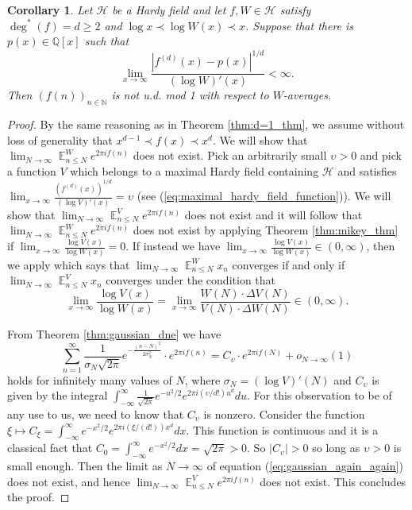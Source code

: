 \documentclass[12pt]{article}
\theoremstyle{plain} %
\newtheorem{corollary}[theorem]{Corollary}
\theoremstyle{definition} %
\theoremstyle{plain}
\theoremstyle{plain}
\numberwithin{equation}{section}
\newcommand{\N}{\mathbb{N}}
\newcommand{\Q}{\mathbb{Q}}
\renewcommand{\leq}{\leqslant}
\renewcommand{\geq}{\geqslant}
\newcommand{\1}{\mathbbm{1}}
\newcommand{\E}{\operatorname{\mathbb{E}}}
\newcommand{\oo}{\infty}
\begin{document}
\begin{corollary}\label{cor:negative_result_d>2}
   Let $\mathcal{H}$ be a Hardy field and let $f,W\in \mathcal{H}$ satisfy $\deg^*(f)=d\geq 2$ and  $\log x\prec \log W(x)\prec x$. Suppose that there is $p(x)\in \Q[x]$ such that 
\begin{equation}\label{eq:gen_bosh_condition_fails}
         \lim_{x\to\oo}\frac{|f^{(d)}(x)-p(x)|^{1/d}}{(\log W)'(x)}<\oo.
 \end{equation}
Then $(f(n))_{n\in \N}$ is not u.d. mod 1 with respect to $W$-averages. 
\end{corollary}
\begin{proof}
By the same reasoning as in Theorem \ref{thm:d=1_thm}, we assume without loss of generality that $x^{d-1}\prec f(x)\prec x^d$. We will show that $\lim_{N\to\oo}\E_{n\leq N}^We^{2\pi i f(n)}$ does not exist. Pick an arbitrarily small $\upsilon>0$ and pick a function $V$ which belongs to a maximal Hardy field containing $\mathcal{H}$ and satisfies $\lim_{x\to\oo}\frac{(f^{(d)}(x))^{1/d}}{(\log V)'(x)}=\upsilon$ (see (\ref{eq:maximal_hardy_field_function})). We will show that $\lim_{N\to\oo}\E_{n\leq N}^Ve^{2\pi i f(n)}$ does not exist and it will follow that $\lim_{N\to\oo}\E_{n\leq N}^We^{2\pi i f(n)}$ does not exist by applying Theorem \ref{thm:mikey_thm} if $\lim_{x\to\oo}\frac{\log V(x)}{\log W(x)}=0$. If instead we have $\lim_{x\to\oo}\frac{\log V(x)}{\log W(x)}\in(0,\oo)$, then we apply \cite[Lemma 7.1]{uniform_distribution} which says that $\lim_{N\to\oo}\E^W_{n\leq N}x_n$ converges if and only if $\lim_{N\to\oo}\E^V_{n\leq N}x_n$ converges under the condition that
$$
\lim_{x\to\oo}\frac{\log V(x)}{\log W(x)} = \lim_{x\to\oo}\frac{W(N)\cdot \Delta V(N)}{V(N)\cdot \Delta W(N)}\in(0,\oo).
$$

From Theorem \ref{thm:gaussian_dne} we have \begin{equation}\label{eq:gaussian_again_again}
    \sum_{n=1}^{\oo}\frac{1}{\sigma_N\sqrt{2\pi}}e^{-\frac{(n-N)^2}{2\sigma_N^2}}\cdot e^{2\pi i f(n)}= C_{\upsilon}\cdot  e^{2\pi i f(N)}+o_{N\to\oo}(1)
   \end{equation}
   holds for infinitely many values of $N$, where $\sigma_N = (\log V)'(N)$ and $C_{\upsilon}$ is given by the integral $ \int_{-\oo}^{\oo} \frac{1}{\sqrt{2\pi}}e^{-u^2/2}e^{2\pi i (\upsilon/d!)u^{d}}du$. For this observation to be of any use to us, we need to know that $C_{\upsilon}$ is nonzero. Consider the function $\xi\mapsto C_{\xi} = \int_{-\infty}^{\infty}e^{-x^2/2}e^{2\pi i (\xi/(d!)) x^{d}}dx$. This function is continuous and it is a classical fact that $C_0 = \int_{-\infty}^{\infty}e^{-x^2/2}dx = \sqrt{2\pi}>0$. So $|C_{\upsilon}|>0$ so long as $\upsilon>0$ is small enough. Then the limit as $N\to\oo$ of equation (\ref{eq:gaussian_again_again}) does not exist, and hence $\lim_{N\to\oo}\E_{n\leq N}^Ve^{2\pi i f(n)}$ does not exist. This concludes the proof.
\end{proof}
\end{document}
